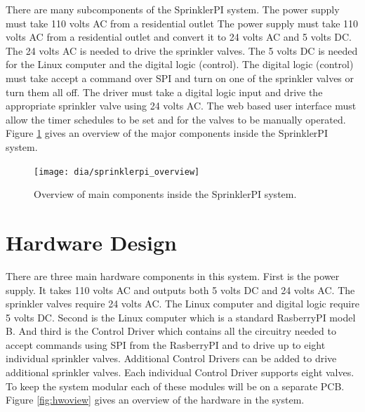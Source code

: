 \documentclass{article}
\begin{document}
There are many subcomponents of the SprinklerPI system.
The power supply must take 110 volts AC from a residential outlet
The power supply must take 110 volts AC from a residential outlet
and convert it to 24 volts AC and 5 volts DC.
The 24 volts AC is needed to drive the sprinkler valves.
The 5 volts DC is needed for the Linux computer and the digital logic (control).
The digital logic (control) must take accept a command over SPI
and turn on one of the sprinkler valves or turn them all off.
The driver must take a digital logic input and drive the appropriate
sprinkler valve using 24 volts AC.
The web based user interface must allow the timer schedules to be
set and for the valves to be manually operated.
Figure \ref{fig:spioview} gives an overview of the major components
inside the SprinklerPI system.

\begin{figure}[h!]
\begin{center}
\texttt{[image: dia/sprinklerpi\_overview]}
\end{center}
\caption{Overview of main components inside the SprinklerPI system.}
\label{fig:spioview}
\end{figure}


\clearpage
\section{Hardware Design}
\label{sec:hardware}

There are three main hardware components in this system.
First is the power supply.
It takes 110 volts AC and outputs both 5 volts DC and 24 volts AC.
The sprinkler valves require 24 volts AC.
The Linux computer and digital logic require 5 volts DC.
Second is the Linux computer which is a standard RasberryPI model B.
And third is the Control Driver which contains all the
circuitry needed to accept commands using SPI from the RasberryPI
and to drive up to eight individual sprinkler valves.
Additional Control Drivers can be added to drive additional sprinkler
valves.
Each individual Control Driver supports eight valves.
To keep the system modular each of these modules will be on a
separate PCB.
Figure \ref{fig:hwoview} gives an overview of the hardware in the system.
\end{document}
